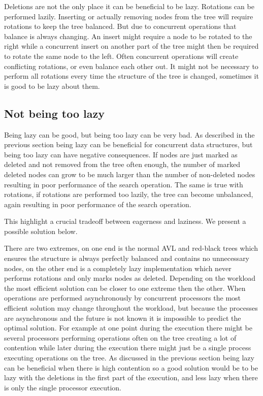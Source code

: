 \documentclass[10pt]{sigplanconf}
\begin{document}
Deletions are not the only place it can be beneficial to be lazy.
Rotations can be performed lazily.
Inserting or actually removing nodes from the tree will require rotations to keep the tree balanced.
But due to concurrent operations that balance is always changing.
An insert might require a node to be rotated to the right while a concurrent insert on another part of the tree might then be required to rotate the same node to the left.
Often concurrent operations will create conflicting rotations, or even balance each other out.
It might not be necessary to perform all rotations every time the structure of the tree is changed, sometimes it is good to be lazy about them.

\subsection{Not being too lazy}
Being lazy can be good, but being too lazy can be very bad.
As described in the previous section being lazy can be beneficial for concurrent data structures, but being too lazy can have negative consequences.
If nodes are just marked as deleted and not removed from the tree often enough, the number of marked deleted nodes can grow to be much larger than the
number of non-deleted nodes resulting in poor performance of the search operation.
The same is true with rotations, if rotations are performed too lazily, the tree can become unbalanced, again resulting in poor performance of the search operation.

This highlight a crucial tradeoff between eagerness and laziness.
We present a possible solution below.

There are two extremes, on one end is the normal AVL and red-black trees which ensures the structure is always perfectly balanced and contains no unnecessary nodes, on the other end is a completely
lazy implementation which never performs rotations and only marks nodes as deleted.
Depending on the workload the most efficient solution can be closer to one extreme then the other.
When operations are performed asynchronously by concurrent processors the most efficient solution may change throughout the workload,
but because the processes are asynchronous and the future is not known it is impossible to predict the optimal solution.
For example at one point during the execution there might be several processors performing operations often on the tree creating a lot of contention
while later during the execution there might just be a single process executing operations on the tree.
As discussed in the previous section being lazy can be beneficial when there is high contention so a good solution would be to be lazy with the
deletions in the first part of the execution, and less lazy when there is only the single processor execution.
\end{document}
